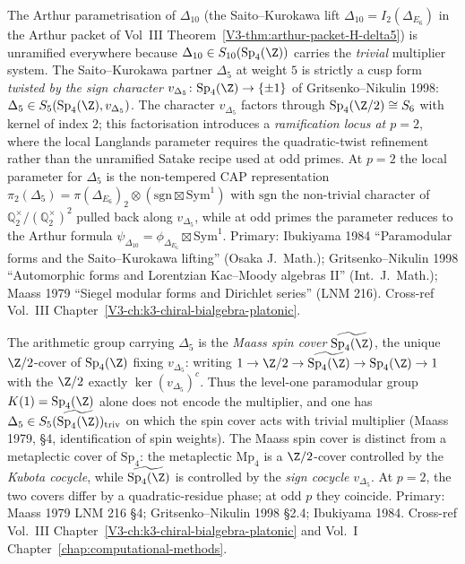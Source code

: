 \begin{remark}[$\Delta_5$ level, character, and $p = 2$ ramification]
\label{rem:cm-delta5-ramification}
The Arthur parametrisation of $\Delta_{10}$ (the Saito--Kurokawa
lift $\Delta_{10} = I_2(\Delta_{E_6})$ in the Arthur packet of
Vol~III Theorem~\ref{V3-thm:arthur-packet-H-delta5}) is unramified
everywhere because $\Delta_{10} \in S_{10}(\mathrm{Sp}_4(\Z))$ carries
the \emph{trivial} multiplier system. The Saito--Kurokawa partner
$\Delta_5$ at weight $5$ is strictly a cusp form
\emph{twisted by the sign character}
$v_{\Delta_5} \colon \mathrm{Sp}_4(\Z) \to \{\pm 1\}$ of
Gritsenko--Nikulin 1998: $\Delta_5 \in S_5(\mathrm{Sp}_4(\Z), v_{\Delta_5})$.
The character $v_{\Delta_5}$ factors through
$\mathrm{Sp}_4(\Z/2) \cong S_6$ with kernel of index $2$; this factorisation
introduces a \emph{ramification locus at $p = 2$}, where the local Langlands
parameter requires the quadratic-twist refinement rather than the
unramified Satake recipe used at odd primes. At $p = 2$ the local
parameter for $\Delta_5$ is the non-tempered CAP representation
$\pi_2(\Delta_5) = \pi(\Delta_{E_6})_2 \otimes (\mathrm{sgn} \boxtimes
\mathrm{Sym}^1)$ with $\mathrm{sgn}$ the non-trivial character of
$\mathbb{Q}_2^\times / (\mathbb{Q}_2^\times)^2$ pulled back along
$v_{\Delta_5}$, while at odd primes the parameter reduces to the
Arthur formula $\psi_{\Delta_{10}} = \phi_{\Delta_{E_6}} \boxtimes
\mathrm{Sym}^1$. Primary:
Ibukiyama 1984 ``Paramodular forms and the Saito--Kurokawa lifting''
(Osaka J.\ Math.); Gritsenko--Nikulin 1998 ``Automorphic forms and
Lorentzian Kac--Moody algebras II'' (Int.\ J.\ Math.); Maass 1979
``Siegel modular forms and Dirichlet series'' (LNM 216).
Cross-ref Vol.~III
Chapter~\ref{V3-ch:k3-chiral-bialgebra-platonic}.
\end{remark}

\begin{remark}
\label{rem:cm-maass-spin}
The arithmetic group carrying $\Delta_5$ is the \emph{Maass spin cover}
$\widetilde{\mathrm{Sp}_4(\Z)}$, the unique $\Z/2$-cover of
$\mathrm{Sp}_4(\Z)$ fixing $v_{\Delta_5}$: writing
$1 \to \Z/2 \to \widetilde{\mathrm{Sp}_4(\Z)} \to \mathrm{Sp}_4(\Z) \to 1$
with the $\Z/2$ exactly $\ker(v_{\Delta_5})^c$.  Thus the level-one
paramodular group \(K(1)=\mathrm{Sp}_4(\Z)\) alone does not encode the
multiplier, and one has
$\Delta_5 \in S_5(\widetilde{\mathrm{Sp}_4(\Z)})_{\mathrm{triv}}$
on which the spin cover acts with trivial multiplier
(Maass 1979, \S 4, identification of spin weights).
The Maass spin cover is distinct from a metaplectic cover
of $\mathrm{Sp}_4$: the metaplectic $\mathrm{Mp}_4$ is a $\Z/2$-cover
controlled by the \emph{Kubota cocycle}, while
$\widetilde{\mathrm{Sp}_4(\Z)}$ is controlled by the
\emph{sign cocycle} $v_{\Delta_5}$. At $p = 2$, the two covers
differ by a quadratic-residue phase; at odd $p$ they coincide.
Primary: Maass 1979 LNM 216 \S 4; Gritsenko--Nikulin 1998 \S 2.4;
Ibukiyama 1984. Cross-ref Vol.~III
Chapter~\ref{V3-ch:k3-chiral-bialgebra-platonic} and Vol.~I
Chapter~\ref{chap:computational-methods}.
\end{remark}

